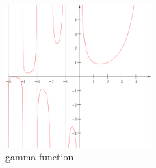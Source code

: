 \begin{figure}
    \centering
    \includegraphics[width=0.5\textwidth]{./figures/gamma_function.png}
    \caption{gamma-function}
    \label{fig:gamma-function}
\end{figure}



